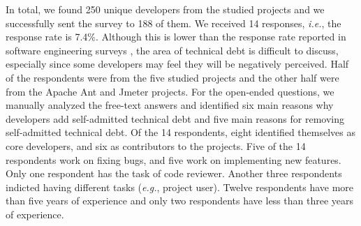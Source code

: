 In total, we found 250 unique developers from the studied projects and we successfully sent the survey to 188 of them.  We received 14 responses, \emph{i.e.}, the response rate is 7.4\%. Although this is lower than the response rate reported in software engineering surveys \cite{Punter2003}, the area of technical debt is difficult to discuss, especially since some developers may feel they will be negatively perceived. Half of the respondents were from the five studied projects and the other half were from the Apache Ant and Jmeter projects. For the open-ended questions, we manually analyzed the free-text answers and identified six main reasons why developers add self-admitted technical debt and five main reasons for removing self-admitted technical debt. Of the 14 respondents, eight identified themselves as core developers, and six as contributors to the projects. Five of the 14 respondents work on fixing bugs, and five work on implementing new features. Only one respondent has the task of code reviewer. Another three respondents indicted having different tasks (\emph{e.g.}, project user). Twelve respondents have more than five years of experience and only two respondents have less than three years of experience.



%			
%			
%	


